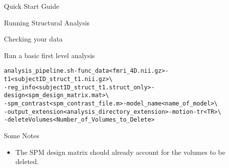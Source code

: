 \documentclass[]{report}
\begin{document}
\begin{chapter}{Quick Start Guide }
\begin{section}{Running Structural Analysis}
\begin{subsection}{Checking your data}
\end{subsection}

\end{section}

\begin{section}{Run a basic first level analysis}
\
\begin{alltt}
analysis\_pipeline.sh  -func\_data <fmri\_4D.nii.gz>   -t1 <subjectID\_struct\_t1.nii.gz>  \textbackslash \\
\hspace*{0.5in} -reg\_info <subjectID\_struct\_t1.struct\_only> -design <spm\_design\_matrix.mat> \textbackslash  \\
\hspace*{0.5in} -spm\_contrast  <spm\_contrast\_file.m> -model\_name <name\_of\_model> \textbackslash   \\
\hspace*{0.5in} -output\_extension <analysis\_directory\_extension>  -motion -tr <TR> \textbackslash  \\
\hspace*{0.5in} -deleteVolumes <Number\_of\_Volumes\_to\_Delete>
\end{alltt}
{Some Notes}
\begin{itemize}
	\item  The SPM design matrix should already account for the volumes to be deleted.
\end{itemize}

\end{section}

\end{chapter}
\end{document}
